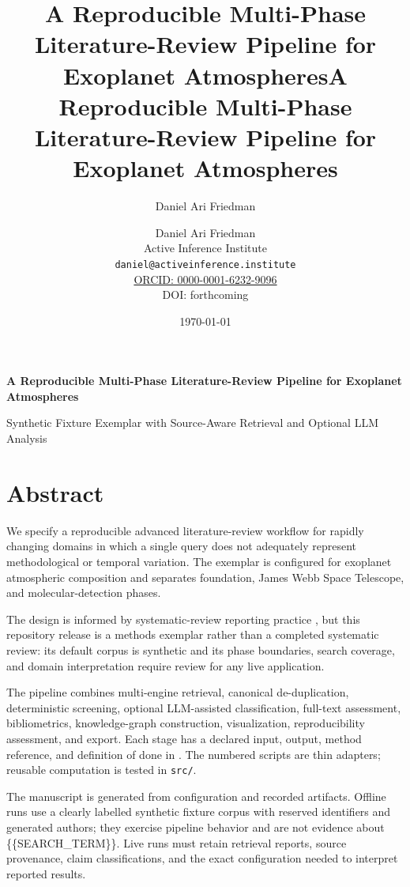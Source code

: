 \documentclass[
]{article}
\title{A Reproducible Multi-Phase Literature-Review Pipeline for
Exoplanet Atmospheres}
\author{Daniel Ari Friedman}
\date{}
\title{A Reproducible Multi-Phase Literature-Review Pipeline for Exoplanet Atmospheres}
\author{Daniel Ari Friedman\\\footnotesize{Active Inference Institute}\\\footnotesize{\texttt{daniel@activeinference.institute}}\\\footnotesize{\href{https://orcid.org/0000-0001-6232-9096}{ORCID: 0000-0001-6232-9096}} \\ \footnotesize{DOI: forthcoming}}
\date{\today}
\begin{document}
\begin{titlepage}
\centering
\vspace*{2cm}
{\LARGE\bfseries A Reproducible Multi-Phase Literature-Review Pipeline for Exoplanet Atmospheres\par}
\vspace{0.75em}
{\large Synthetic Fixture Exemplar with Source-Aware Retrieval and Optional LLM Analysis\par}
\vfill
\makeatletter
{\@author\par}
\vspace{1em}
{\@date\par}
\makeatother
\vfill
\end{titlepage}
\thispagestyle{empty}
\tableofcontents
\newpage

\section{Abstract}\label{abstract}

We specify a reproducible advanced literature-review workflow for
rapidly changing domains in which a single query does not adequately
represent methodological or temporal variation. The exemplar is
configured for exoplanet atmospheric composition and separates
foundation, James Webb Space Telescope, and molecular-detection phases.

The design is informed by systematic-review reporting practice
\citep{page2021prisma}, but this repository release is a methods
exemplar rather than a completed systematic review: its default corpus
is synthetic and its phase boundaries, search coverage, and domain
interpretation require review for any live application.

The pipeline combines multi-engine retrieval, canonical de-duplication,
deterministic screening, optional LLM-assisted classification, full-text
assessment, bibliometrics, knowledge-graph construction, visualization,
reproducibility assessment, and export. Each stage has a declared input,
output, method reference, and definition of done in
. The numbered scripts are thin adapters;
reusable computation is tested in \texttt{src/}.

The manuscript is generated from configuration and recorded artifacts.
Offline runs use a clearly labelled synthetic fixture corpus with
reserved identifiers and generated authors; they exercise pipeline
behavior and are not evidence about \{\{SEARCH\_TERM\}\}. Live runs must
retain retrieval reports, source provenance, claim classifications, and
the exact configuration needed to interpret reported results.
\end{document}
